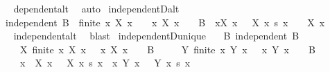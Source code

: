 \begin{isabellebody}
%
\isadelimproof
\ \ %
\endisadelimproof
%
\isatagproof
{}\isamarkupfalse%
\ dependent{\isacharunderscore}{\kern0pt}alt\ \isamarkupfalse%
\ auto%
\endisatagproof
{\isafoldproof}%
%
\isadelimproof
\isanewline
%
\endisadelimproof
\isanewline
{}\isamarkupfalse%
\ independentD{\isacharunderscore}{\kern0pt}alt{\isacharcolon}{\kern0pt}\isanewline
\ \ {\isachardoublequoteopen}independent\ B\ {\isasymLongrightarrow}\ finite\ {\isacharbraceleft}{\kern0pt}x{\isachardot}{\kern0pt}\ X\ x\ {\isasymnoteq}\ {}{\isacharbraceright}{\kern0pt}\ {\isasymLongrightarrow}\ {\isacharbraceleft}{\kern0pt}x{\isachardot}{\kern0pt}\ X\ x\ {\isasymnoteq}\ {}{\isacharbraceright}{\kern0pt}\ {\isasymsubseteq}\ B\ {\isasymLongrightarrow}\ {\isacharparenleft}{\kern0pt}{\isasymSum}x{\isacharbar}{\kern0pt}X\ x\ {\isasymnoteq}\ {}{\isachardot}{\kern0pt}\ X\ x\ {\isacharasterisk}{\kern0pt}s\ x{\isacharparenright}{\kern0pt}\ {\isacharequal}{\kern0pt}\ {}\ {\isasymLongrightarrow}\ X\ x\ {\isacharequal}{\kern0pt}\ {}{\isachardoublequoteclose}\isanewline
%
\isadelimproof
\ \ %
\endisadelimproof
%
\isatagproof
{}\isamarkupfalse%
\ independent{\isacharunderscore}{\kern0pt}alt\ \isamarkupfalse%
\ blast%
\endisatagproof
{\isafoldproof}%
%
\isadelimproof
\isanewline
%
\endisadelimproof
\isanewline
{}\isamarkupfalse%
\ independentD{\isacharunderscore}{\kern0pt}unique{\isacharcolon}{\kern0pt}\isanewline
\ \ \ B{\isacharcolon}{\kern0pt}\ {\isachardoublequoteopen}independent\ B{\isachardoublequoteclose}\isanewline
\ \ \ \ \ X{\isacharcolon}{\kern0pt}\ {\isachardoublequoteopen}finite\ {\isacharbraceleft}{\kern0pt}x{\isachardot}{\kern0pt}\ X\ x\ {\isasymnoteq}\ {}{\isacharbraceright}{\kern0pt}{\isachardoublequoteclose}\ {\isachardoublequoteopen}{\isacharbraceleft}{\kern0pt}x{\isachardot}{\kern0pt}\ X\ x\ {\isasymnoteq}\ {}{\isacharbraceright}{\kern0pt}\ {\isasymsubseteq}\ B{\isachardoublequoteclose}\isanewline
\ \ \ \ \ Y{\isacharcolon}{\kern0pt}\ {\isachardoublequoteopen}finite\ {\isacharbraceleft}{\kern0pt}x{\isachardot}{\kern0pt}\ Y\ x\ {\isasymnoteq}\ {}{\isacharbraceright}{\kern0pt}{\isachardoublequoteclose}\ {\isachardoublequoteopen}{\isacharbraceleft}{\kern0pt}x{\isachardot}{\kern0pt}\ Y\ x\ {\isasymnoteq}\ {}{\isacharbraceright}{\kern0pt}\ {\isasymsubseteq}\ B{\isachardoublequoteclose}\isanewline
\ \ \ \ \ {\isachardoublequoteopen}{\isacharparenleft}{\kern0pt}{\isasymSum}x\ {\isacharbar}{\kern0pt}\ X\ x\ {\isasymnoteq}\ {}{\isachardot}{\kern0pt}\ X\ x\ {\isacharasterisk}{\kern0pt}s\ x{\isacharparenright}{\kern0pt}\ {\isacharequal}{\kern0pt}\ {\isacharparenleft}{\kern0pt}{\isasymSum}x{\isacharbar}{\kern0pt}\ Y\ x\ {\isasymnoteq}\ {}{\isachardot}{\kern0pt}\ Y\ x\ {\isacharasterisk}{\kern0pt}s\ x{\isacharparenright}{\kern0pt}{\isachardoublequoteclose}\isanewline

\end{isabellebody}
